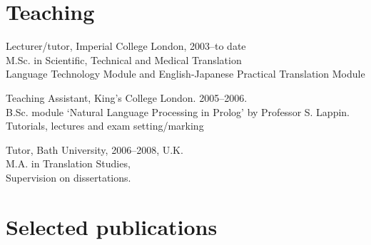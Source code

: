 \documentclass[a4paper]{article}
\renewenvironment{itemize}{
  \begin{list}{}{
    \setlength{\leftmargin}{1.5em}
  }
}{
  \end{list}
}
\begin{document}
\section*{Teaching}
\begin{itemize}

\item Lecturer/tutor, Imperial College London,  2003--to date\\
   M.Sc. in Scientific, Technical and Medical Translation \\
   Language Technology Module and English-Japanese Practical Translation Module

\item Teaching Assistant, King's College London. 2005--2006.\\
    B.Sc. module `Natural Language Processing in Prolog' by Professor S. Lappin.\\
   Tutorials, lectures and exam setting/marking



\item Tutor, Bath University, 2006--2008, U.K.\\
   M.A. in Translation Studies, \\Supervision on dissertations.


\end{itemize}


\section*{Selected publications}
\end{document}
